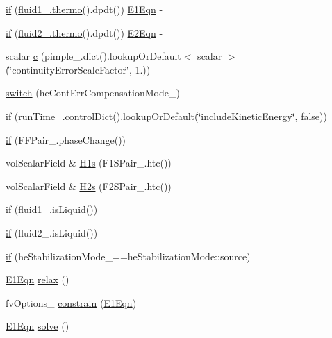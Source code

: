 \begin{DoxyCompactItemize}
\item 
\hyperlink{EEqns__2p_8H_a8a98436e04a507a69c16dbd95b223199}{if} (\hyperlink{EEqns__2p_8H_a9d615e711281a88a96c648787c7dbd32}{fluid1\+\_\+.\+thermo}().dpdt()) \hyperlink{EEqns__2p_8H_aae1ffa52568648b9eda495d1c9210720}{E1\+Eqn} -\/
\item 
\hyperlink{EEqns__2p_8H_a041b5a44987a70dda8558d99c19e276e}{if} (\hyperlink{EEqns__2p_8H_a9d615e711281a88a96c648787c7dbd32}{fluid2\+\_\+.\+thermo}().dpdt()) \hyperlink{EEqns__2p_8H_ab7195c21c6aa9878d09f3679e78a218b}{E2\+Eqn} -\/
\item 
scalar \hyperlink{EEqns__2p_8H_a41a371debc8f4fa40469231470618dda}{c} (pimple\+\_\+.\+dict().lookup\+Or\+Default$<$ scalar $>$(\char`\"{}continuity\+Error\+Scale\+Factor\char`\"{}, 1.))
\item 
\hyperlink{EEqns__2p_8H_a1f307073659ff88213c8e02a249d400e}{switch} (he\+Cont\+Err\+Compensation\+Mode\+\_\+)
\item 
\hyperlink{EEqns__2p_8H_afd9ea30219c5c05c86bc2eaaafe6a378}{if} (run\+Time\+\_\+.\+control\+Dict().lookup\+Or\+Default(\char`\"{}include\+Kinetic\+Energy\char`\"{}, false))
\item 
\hyperlink{EEqns__2p_8H_a97ae903740550c29a2c4daa299c86967}{if} (F\+F\+Pair\+\_\+.\+phase\+Change())
\item 
vol\+Scalar\+Field \& \hyperlink{EEqns__2p_8H_a13d3a489c9472a915deb39f3ac78bb3f}{H1s} (F1\+S\+Pair\+\_\+.\+htc())
\item 
vol\+Scalar\+Field \& \hyperlink{EEqns__2p_8H_ae1c73dc439878108bb08a1763fb58109}{H2s} (F2\+S\+Pair\+\_\+.\+htc())
\item 
\hyperlink{EEqns__2p_8H_afbb4efa5fb441aa35a26fefc571e5f78}{if} (fluid1\+\_\+.\+is\+Liquid())
\item 
\hyperlink{EEqns__2p_8H_a9fbb44a037f6db834ade28d6a2737228}{if} (fluid2\+\_\+.\+is\+Liquid())
\item 
\hyperlink{EEqns__2p_8H_a5d38b537890f4fed230a851bae818010}{if} (he\+Stabilization\+Mode\+\_\+==he\+Stabilization\+Mode\+::source)
\item 
\hyperlink{EEqns__2p_8H_aae1ffa52568648b9eda495d1c9210720}{E1\+Eqn} \hyperlink{EEqns__2p_8H_a240f41b3b79e9bdfa9cbf2123530e238}{relax} ()
\item 
fv\+Options\+\_\+ \hyperlink{EEqns__2p_8H_aa8f9950942fbd5f092c018ef6720d50b}{constrain} (\hyperlink{EEqns__2p_8H_aae1ffa52568648b9eda495d1c9210720}{E1\+Eqn})
\item 
\hyperlink{EEqns__2p_8H_aae1ffa52568648b9eda495d1c9210720}{E1\+Eqn} \hyperlink{EEqns__2p_8H_afbbd20f0ff5150c71a4f076348c1c48b}{solve} ()

\end{DoxyCompactItemize}
